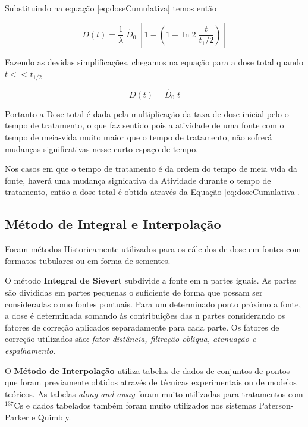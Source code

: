 \documentclass[11pt,a4paper]{article}
\begin{document}
			Substituindo na equação \ref{eq:doseCumulativa} temos então

			$$D(t) = \frac{1}{\lambda} \; \dot{D_0} \; \left[1 - \left(1 - \ln 2 \; \frac{t}{t_1/2}\right)\right]$$

			Fazendo as devidas simplificações, chegamos na equação para a dose total quando $t << t_{1/2}$

			\begin{equation}
				D(t) = \dot{D_0} \; t
				\label{eq:AproximacaoImplantesTemporarios}
			\end{equation}

			Portanto a Dose total é dada pela multiplicação da taxa de dose inicial pelo o tempo de tratamento, o que faz sentido pois a atividade de uma fonte com o tempo de meia-vida muito maior que o tempo de tratamento, não sofrerá mudanças significativas nesse curto espaço de tempo.


			Nos casos em que o tempo de tratamento é da ordem do tempo de meia vida da fonte, haverá uma mudança signicativa da Atividade durante o tempo de tratamento, então a dose total é obtida através da Equação \ref{eq:doseCumulativa}.

		\subsection{Método de Integral e Interpolação}

			Foram métodos Historicamente utilizados para os cálculos de dose em fontes com formatos tubulares ou em forma de sementes.

			O método \textbf{\textcolor{CarnationPink}{Integral de Sievert}} subdivide a fonte em n partes iguais. As partes são divididas em partes pequenas o suficiente de forma que possam ser consideradas como fontes pontuais. Para um determinado ponto próximo a fonte, a dose é determinada somando às contribuições das n partes considerando os fatores de correção aplicados separadamente para cada parte. Os fatores de correção utilizados são: \textit{fator distância, filtração obliqua, atenuação e espalhamento}.

			O \textbf{\textcolor{CarnationPink}{Método de Interpolação}} utiliza tabelas de dados de conjuntos de pontos que foram previamente obtidos através de técnicas experimentais ou de modelos teóricos. As tabelas \textit{\textcolor{CarnationPink}{along-and-away}} foram muito utilizadas para tratamentos com $\mathrm{{}^{137}Cs}$ e dados tabelados também foram muito utilizados nos sistemas Paterson-Parker e Quimbly.
\end{document}
